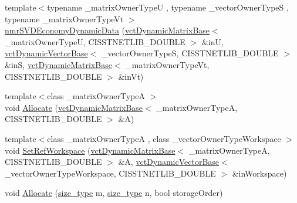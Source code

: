 \begin{DoxyCompactItemize}
\item 
{\footnotesize template$<$typename \-\_\-matrix\-Owner\-Type\-U , typename \-\_\-vector\-Owner\-Type\-S , typename \-\_\-matrix\-Owner\-Type\-Vt $>$ }\\\hyperlink{classnmr_s_v_d_economy_dynamic_data_a0ff8719e0511570efb6a9f405e26b1ab}{nmr\-S\-V\-D\-Economy\-Dynamic\-Data} (\hyperlink{classvct_dynamic_matrix_base}{vct\-Dynamic\-Matrix\-Base}$<$ \-\_\-matrix\-Owner\-Type\-U, C\-I\-S\-S\-T\-N\-E\-T\-L\-I\-B\-\_\-\-D\-O\-U\-B\-L\-E $>$ \&in\-U, \hyperlink{classvct_dynamic_vector_base}{vct\-Dynamic\-Vector\-Base}$<$ \-\_\-vector\-Owner\-Type\-S, C\-I\-S\-S\-T\-N\-E\-T\-L\-I\-B\-\_\-\-D\-O\-U\-B\-L\-E $>$ \&in\-S, \hyperlink{classvct_dynamic_matrix_base}{vct\-Dynamic\-Matrix\-Base}$<$ \-\_\-matrix\-Owner\-Type\-Vt, C\-I\-S\-S\-T\-N\-E\-T\-L\-I\-B\-\_\-\-D\-O\-U\-B\-L\-E $>$ \&in\-Vt)
\item 
{\footnotesize template$<$class \-\_\-matrix\-Owner\-Type\-A $>$ }\\void \hyperlink{classnmr_s_v_d_economy_dynamic_data_a5e651fb49ec95df60b349da9ae75825b}{Allocate} (\hyperlink{classvct_dynamic_matrix_base}{vct\-Dynamic\-Matrix\-Base}$<$ \-\_\-matrix\-Owner\-Type\-A, C\-I\-S\-S\-T\-N\-E\-T\-L\-I\-B\-\_\-\-D\-O\-U\-B\-L\-E $>$ \&A)
\item 
{\footnotesize template$<$class \-\_\-matrix\-Owner\-Type\-A , class \-\_\-vector\-Owner\-Type\-Workspace $>$ }\\void \hyperlink{classnmr_s_v_d_economy_dynamic_data_a3f26619024e95d85cf0eb278ab1c38cd}{Set\-Ref\-Workspace} (\hyperlink{classvct_dynamic_matrix_base}{vct\-Dynamic\-Matrix\-Base}$<$ \-\_\-matrix\-Owner\-Type\-A, C\-I\-S\-S\-T\-N\-E\-T\-L\-I\-B\-\_\-\-D\-O\-U\-B\-L\-E $>$ \&A, \hyperlink{classvct_dynamic_vector_base}{vct\-Dynamic\-Vector\-Base}$<$ \-\_\-vector\-Owner\-Type\-Workspace, C\-I\-S\-S\-T\-N\-E\-T\-L\-I\-B\-\_\-\-D\-O\-U\-B\-L\-E $>$ \&in\-Workspace)
\item 
void \hyperlink{classnmr_s_v_d_economy_dynamic_data_ac634e44b5fd988ecca089686b5b4bb31}{Allocate} (\hyperlink{classnmr_s_v_d_economy_dynamic_data_aee8ff15f2e92af24fdc3c7f5908770f3}{size\-\_\-type} m, \hyperlink{classnmr_s_v_d_economy_dynamic_data_aee8ff15f2e92af24fdc3c7f5908770f3}{size\-\_\-type} n, bool storage\-Order)
\item 

\end{DoxyCompactItemize}
